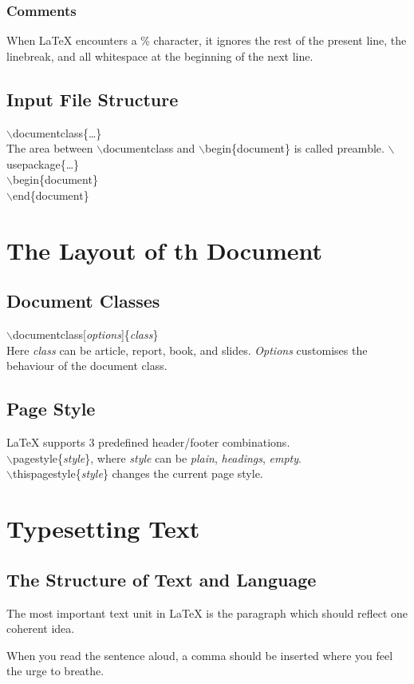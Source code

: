 \documentclass[11pt,a4paper]{article}
\begin{document}
\subsubsection{Comments}
When \LaTeX{} encounters a \% character, 
it ignores the rest of the present line, the linebreak,
and all whitespace at the beginning of the next line.
\subsection{Input File Structure}
$\backslash$documentclass\{\ldots\}\\
The area between $\backslash$documentclass and $\backslash$begin\{document\} is called preamble.
$\backslash$usepackage\{\ldots\}\\
$\backslash$begin\{document\}\\
$\backslash$end\{document\}
\section{The Layout of th Document}
\subsection{Document Classes}
$\backslash$documentclass[\textit{options}]\{\textit{class}\}\\
Here \textit{class} can be article, report, book, and slides. \textit{Options} 
customises the behaviour of the document class.
\subsection{Page Style}
\LaTeX{} supports 3 predefined header/footer combinations.\\
$\backslash$pagestyle\{\textsl{style}\}, where
\textsl{style} can be \textsl{plain}, \textsl{headings}, \textsl{empty}.\\
$\backslash$thispagestyle\{\textsl{style}\} changes the current page style.
\section{Typesetting Text}
\subsection{The Structure of Text and Language}
The most important text unit in \LaTeX{} is the paragraph which should reflect
one coherent idea.

When you read the sentence aloud, a comma should be inserted where you feel 
the urge to breathe.
\end{document}
